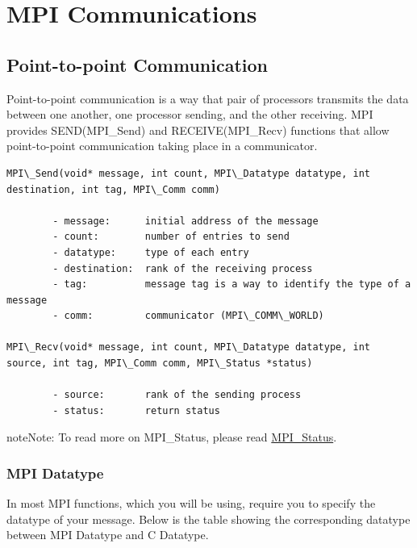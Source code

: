 \documentclass[letterpaper,10pt,openany,oneside]{sphinxmanual}
\begin{document}
\chapter{MPI Communications}
\label{MPICommunication/MPICommunication:mpi-communications}\label{MPICommunication/MPICommunication::doc}

\section{Point-to-point Communication}
\label{MPICommunication/MPICommunication:point-to-point-communication}
Point-to-point communication is a way that pair of processors transmits the data between one another, one processor sending, and the other receiving. MPI provides SEND(MPI\_Send) and RECEIVE(MPI\_Recv) functions that allow point-to-point communication taking place in a communicator.

\begin{Verbatim}[commandchars=\\\{\}]
MPI\_Send(void* message, int count, MPI\_Datatype datatype, int destination, int tag, MPI\_Comm comm)

        - message:      initial address of the message
        - count:        number of entries to send
        - datatype:     type of each entry
        - destination:  rank of the receiving process
        - tag:          message tag is a way to identify the type of a message
        - comm:         communicator (MPI\_COMM\_WORLD)

MPI\_Recv(void* message, int count, MPI\_Datatype datatype, int source, int tag, MPI\_Comm comm, MPI\_Status *status)

        - source:       rank of the sending process
        - status:       return status
\end{Verbatim}

\begin{notice}{note}{Note:}
To read more on MPI\_Status, please read \href{http://www.netlib.org/utk/papers/mpi-book/node31.html}{MPI\_Status}.
\end{notice}


\subsection{MPI Datatype}
\label{MPICommunication/MPICommunication:mpi-datatype}
In most MPI functions, which you will be using, require you to specify the datatype of your message. Below is the table showing the corresponding datatype between MPI Datatype and C Datatype.
\end{document}
